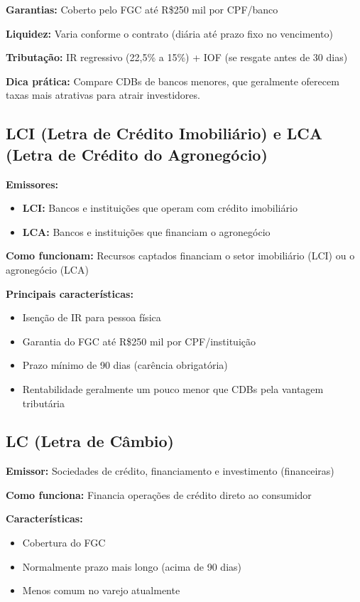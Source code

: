 \textbf{Garantias:} Coberto pelo FGC até R\$250 mil por CPF/banco

\textbf{Liquidez:} Varia conforme o contrato (diária até prazo fixo no vencimento)

\textbf{Tributação:} IR regressivo (22,5\% a 15\%) + IOF (se resgate antes de 30 dias)

\textbf{Dica prática:} Compare CDBs de bancos menores, que geralmente oferecem taxas mais atrativas para atrair investidores.

\subsection{LCI (Letra de Crédito Imobiliário) e LCA (Letra de Crédito do Agronegócio)}
\label{subsec:lci-lca}

\textbf{Emissores:}
\begin{itemize}
    \item \textbf{LCI:} Bancos e instituições que operam com crédito imobiliário
    \item \textbf{LCA:} Bancos e instituições que financiam o agronegócio
\end{itemize}

\textbf{Como funcionam:} Recursos captados financiam o setor imobiliário (LCI) ou o agronegócio (LCA)

\textbf{Principais características:}
\begin{itemize}
    \item Isenção de IR para pessoa física
    \item Garantia do FGC até R\$250 mil por CPF/instituição
    \item Prazo mínimo de 90 dias (carência obrigatória)
    \item Rentabilidade geralmente um pouco menor que CDBs pela vantagem tributária
\end{itemize}

\subsection{LC (Letra de Câmbio)}
\label{subsec:lc}

\textbf{Emissor:} Sociedades de crédito, financiamento e investimento (financeiras)

\textbf{Como funciona:} Financia operações de crédito direto ao consumidor

\textbf{Características:}
\begin{itemize}
    \item Cobertura do FGC
    \item Normalmente prazo mais longo (acima de 90 dias)
    \item Menos comum no varejo atualmente
\end{itemize}

